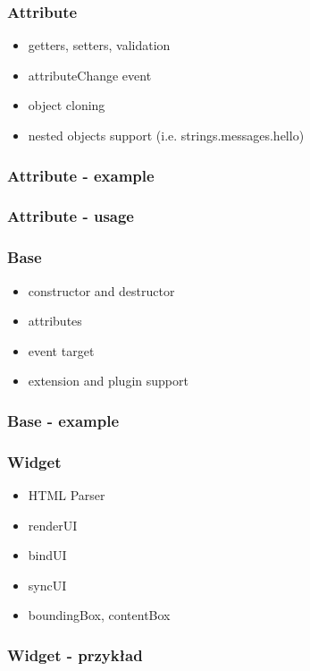 \documentclass[16pt]{beamer}
\begin{document}
\begin{frame}
  \frametitle{Attribute}
  \begin{itemize}
  \item getters, setters, validation
  \item attributeChange event
  \item object cloning
  \item nested objects support (i.e. strings.messages.hello)
  \end{itemize}
\end{frame}

\begin{frame}[fragile]
  \frametitle{Attribute - example}
  
\end{frame}

\begin{frame}[fragile]
  \frametitle{Attribute - usage}
  
\end{frame}

\begin{frame}
  \frametitle{Base}
  \begin{itemize}
  \item constructor and destructor
  \item attributes
  \item event target
  \item extension and plugin support
  \end{itemize}
\end{frame}

\begin{frame}[fragile]
  \frametitle{Base - example}
  
\end{frame}

\begin{frame}
  \frametitle{Widget}
  \begin{itemize}
  \item HTML Parser
  \item renderUI
  \item bindUI
  \item syncUI
  \item boundingBox, contentBox
  \end{itemize}
\end{frame}

\begin{frame}[fragile]
  \frametitle{Widget - przykład}
  \begin{footnotesize}
    
  \end{footnotesize}
\end{frame}
\end{document}
